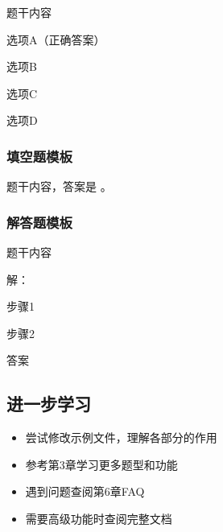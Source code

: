 \begin{latexcode}
  \begin{question}
    题干内容 \paren[A]
    \begin{choices}
      \item 选项A（正确答案）
      \item 选项B
      \item 选项C
      \item 选项D
    \end{choices}
  \end{question}
\end{latexcode}

\subsubsection{填空题模板}

\begin{latexcode}
  \begin{question}
    题干内容，答案是 \fillin[答案] 。
  \end{question}
\end{latexcode}

\subsubsection{解答题模板}

\begin{latexcode}
  \begin{problem}[points = 10]
    题干内容

    \begin{solution}
      解：

      步骤1 

      步骤2 

      答案 
    \end{solution}
  \end{problem}
\end{latexcode}

\subsection{进一步学习}

\begin{itemize}
  \item 尝试修改示例文件，理解各部分的作用
  \item 参考第3章学习更多题型和功能
  \item 遇到问题查阅第6章FAQ
  \item 需要高级功能时查阅完整文档 
\end{itemize}
